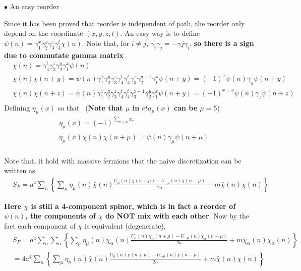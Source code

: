 $\bullet$ An easy reorder

Since it has been proved that reorder is independent of path, the reorder only depend on the coordinate $(x,y,z,t)$. An easy way is to define $\psi (n)=\gamma _1^x\gamma _2^y\gamma _3^z\gamma _4^t \chi (n)$. Note that, for $i\neq j$, $\gamma _i \gamma _j = -\gamma j \gamma _i$, \textbf{so there is a sign due to commutate gamma matrix}
\begin{equation}
\begin{split}
&\chi (n)=\gamma _4^t  \gamma _3^z \gamma _2^y  \gamma _1^x\psi (n)\\
&\bar{\chi}(n) \chi (n+y)= \bar{\psi} (n)\gamma _1^x \gamma _2^y \gamma _3^z \gamma _4^t \gamma _4^t  \gamma _3^z \gamma _2^{y+1}  \gamma _1^x\psi (n + y)=(-1)^x \bar{\psi} (n) \gamma _y \psi (n+y)\\
&\bar{\chi}(n) \chi (n+z)= \bar{\psi} (n)\gamma _1^x \gamma _2^y \gamma _3^z \gamma _4^t \gamma _4^t  \gamma _3^{z+1} \gamma _2^y  \gamma _1^x\psi (n + y)=(-1)^{x+y} \bar{\psi} (n) \gamma _z \psi (n+z)\\
\end{split}
\end{equation}
Defining $\eta_{\mu}(x)$ so that ~(\textbf{Note that $\mu$ in $eta _{\mu}(x)$ can be $\mu=5$})
\begin{equation}
\begin{split}
&\eta _{\mu}(x) = (-1)^{\sum _{\nu < \mu} x_{\nu}}\\
&\eta _{\mu}(x)\bar{\chi}(n) \chi (n+\mu)= \bar{\psi}(n) \gamma _{\mu} \psi (n+\mu)\\
\end{split}
\end{equation}

Note that, it hold with massive fermions that the naive discretization can be written as
\begin{equation}
\begin{split}
&S_F=a^4\sum _n\left\{\sum _{\mu}\eta _{\mu}(n)\bar{\chi}(n) \frac{U_{\mu}(n) \chi (n+\mu) - U_{-\mu}(n)\chi (n-\mu)}{2a} + m \bar{\chi}(n)\chi (n)\right\}
\end{split}
\end{equation}

\textbf{Here $\chi$ is still a 4-component spinor, which is in fact a reorder of $\psi (n)$, the components of $\chi$ do NOT mix with each other}. Now by the fact each component of $\chi$ is equivalent (degenerate),
\begin{equation}
\begin{split}
&S_F=a^4\sum _n\sum _{\alpha}\left\{\sum _{\mu}\eta _{\mu}(n)\bar{\chi}_{\alpha}(n) \frac{U_{\mu}(n) \chi_{\alpha} (n+\mu) - U_{-\mu}(n)\chi _{\alpha}(n-\mu)}{2a} + m \bar{\chi}_{\alpha}(n)\chi_{\alpha} (n)\right\}\\
&=4a^4\sum _n\left\{\sum _{\mu}\eta _{\mu}(n)\bar{\chi}(n) \frac{U_{\mu}(n) \chi (n+\mu) - U_{-\mu}(n)\chi (n-\mu)}{2a} + m \bar{\chi}(n)\chi (n)\right\}\\
\end{split}
\label{eq.naivestaggeredaction}
\end{equation}

